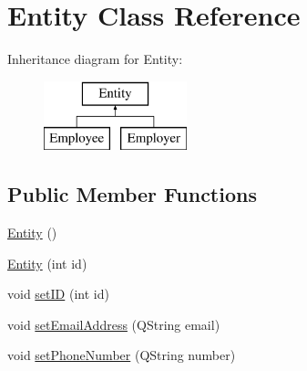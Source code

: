 \hypertarget{class_entity}{\section{Entity Class Reference}
\label{class_entity}
}
Inheritance diagram for Entity\-:\begin{figure}[H]
\begin{center}
\leavevmode
\includegraphics[height=2.000000cm]{class_entity}
\end{center}
\end{figure}
\subsection*{Public Member Functions}
\begin{DoxyCompactItemize}
\item 
\hyperlink{class_entity_a980f368aa07ce358583982821533a54a}{Entity} ()
\item 
\hyperlink{class_entity_ac98bd610e0299cc2aa0538fb2884ab69}{Entity} (int id)
\item 
void \hyperlink{class_entity_a342c3b5da7ceb6c9d983dc8b383f840c}{set\-I\-D} (int id)
\item 
void \hyperlink{class_entity_a8fc9bd93089975942bc43fcb6348b54e}{set\-Email\-Address} (Q\-String email)
\item 
void \hyperlink{class_entity_ae77a743451076f70f2da3376678a9e01}{set\-Phone\-Number} (Q\-String number)
\end{DoxyCompactItemize}

